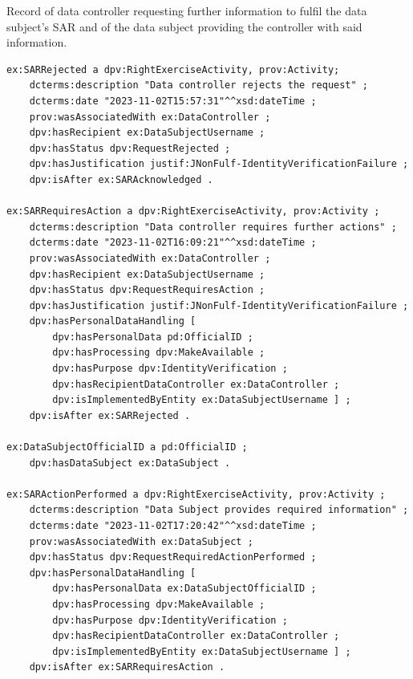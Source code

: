 \begin{listing}[htp]
\caption[Record requesting further information to fulfil SAR.]{Record of data controller requesting further information to fulfil the data subject's SAR and of the data subject providing the controller with said information.}
\label{list:further_action}
\begin{verbatim}
ex:SARRejected a dpv:RightExerciseActivity, prov:Activity;
    dcterms:description "Data controller rejects the request" ;
    dcterms:date "2023-11-02T15:57:31"^^xsd:dateTime ;
    prov:wasAssociatedWith ex:DataController ;
    dpv:hasRecipient ex:DataSubjectUsername ;
    dpv:hasStatus dpv:RequestRejected ;
    dpv:hasJustification justif:JNonFulf-IdentityVerificationFailure ;
    dpv:isAfter ex:SARAcknowledged .

ex:SARRequiresAction a dpv:RightExerciseActivity, prov:Activity ;
    dcterms:description "Data controller requires further actions" ;
    dcterms:date "2023-11-02T16:09:21"^^xsd:dateTime ;
    prov:wasAssociatedWith ex:DataController ;
    dpv:hasRecipient ex:DataSubjectUsername ;
    dpv:hasStatus dpv:RequestRequiresAction ;
    dpv:hasJustification justif:JNonFulf-IdentityVerificationFailure ;
    dpv:hasPersonalDataHandling [
        dpv:hasPersonalData pd:OfficialID ;
        dpv:hasProcessing dpv:MakeAvailable ;
        dpv:hasPurpose dpv:IdentityVerification ;
        dpv:hasRecipientDataController ex:DataController ;
        dpv:isImplementedByEntity ex:DataSubjectUsername ] ;
    dpv:isAfter ex:SARRejected .

ex:DataSubjectOfficialID a pd:OfficialID ;
    dpv:hasDataSubject ex:DataSubject .

ex:SARActionPerformed a dpv:RightExerciseActivity, prov:Activity ;
    dcterms:description "Data Subject provides required information" ;
    dcterms:date "2023-11-02T17:20:42"^^xsd:dateTime ;
    prov:wasAssociatedWith ex:DataSubject ;
    dpv:hasStatus dpv:RequestRequiredActionPerformed ;
    dpv:hasPersonalDataHandling [
        dpv:hasPersonalData ex:DataSubjectOfficialID ;
        dpv:hasProcessing dpv:MakeAvailable ;
        dpv:hasPurpose dpv:IdentityVerification ;
        dpv:hasRecipientDataController ex:DataController ;
        dpv:isImplementedByEntity ex:DataSubjectUsername ] ;
    dpv:isAfter ex:SARRequiresAction .
\end{verbatim}
\end{listing}

